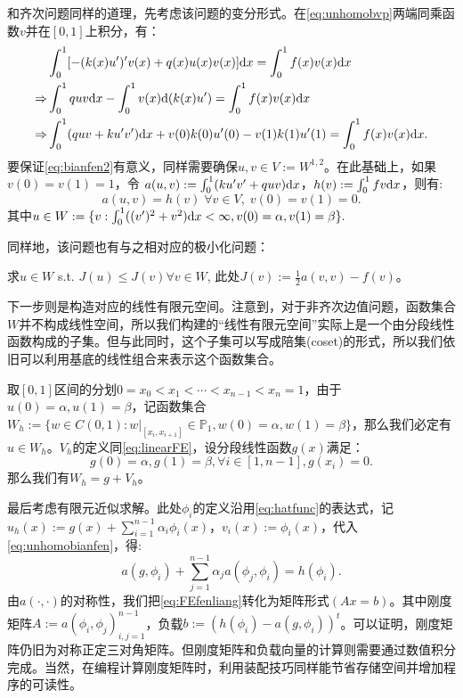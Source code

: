 和齐次问题同样的道理，先考虑该问题的变分形式。在\eqref{eq:unhomobvp}两端同乘函数$v$并在$[0,1]$上积分，有：
\begin{equation}
  \label{eq:bianfen2}
  \begin{aligned}
  &\int_{0}^{1}[-(k(x)u')'v(x)+q(x)u(x)v(x)]\mathrm{d} x=\int_{0}^{1}f(x)v(x)\mathrm{d} x\\
  \Rightarrow &\int_{0}^{1}quv\mathrm{d} x-\int_{0}^{1}v(x)\mathrm{d}(k(x)u')=\int_{0}^{1}f(x)v(x)\mathrm{d} x\\
  \Rightarrow &\int_{0}^{1}(quv+ku'v')\mathrm{d} x+v(0)k(0)u'(0)-v(1)k(1)u'(1)=\int_{0}^{1}f(x)v(x)\mathrm{d} x.\\
  \end{aligned}
\end{equation}
要保证\eqref{eq:bianfen2}有意义，同样需要确保$u,v\in V:=W^{1,2}$。在此基础上，如果$v(0)=v(1)=1$，令
$a(u,v):=\int_{0}^{1}(ku'v'+quv)\mathrm{d} x$，$h(v):=\int_{0}^{1}fv\mathrm{d} x$，则有:
\begin{equation}
  \label{eq:unhomobianfen}
  a(u,v)=h(v)\;\forall v\in V,\; v(0)=v(1)=0.
\end{equation}
其中$u\in W:=\{v:\int_{0}^{1}((v')^{2}+v^2)\mathrm{d} x<\infty, v(0)=\alpha, v(1)=\beta\}.$

同样地，该问题也有与之相对应的极小化问题：
\begin{example}
  \label{ex:optimal2}
  求$u\in W$ s.t. $J(u)\le J(v)\forall v\in W$, 此处$J(v):=\frac{1}{2}a(v,v)-f(v)$。
\end{example}

下一步则是构造对应的线性有限元空间。注意到，对于非齐次边值问题，函数集合$W$并不构成线性空间，所以我们构建的“线性有限元空间”实际上是一个由分段线性函数构成的子集。但与此同时，这个子集可以写成陪集(coset)的形式，所以我们依旧可以利用基底的线性组合来表示这个函数集合。

取$[0,1]$区间的分划$0=x_{0}<x_{1}<\cdots<x_{n-1}<x_{n}=1$，由于$u(0)=\alpha,u(1)=\beta$，记函数集合$W_{h}:=\{w\in C(0,1):w|_{[x_{i},x_{i+1}]}\in\mathbb{P}_{1},w(0)=\alpha,w(1)=\beta\}$，那么我们必定有$u\in W_{h}$。$V_{h}$的定义同\ref{eq:linearFE}，设分段线性函数$g(x)$满足：
\begin{equation}
  \label{eq:segmentlinearcondition}
  g(0)=\alpha,g(1)=\beta,\forall i\in[1,n-1],g(x_{i})=0.
\end{equation}
那么我们有$W_{h}=g+V_{h}$。

最后考虑有限元近似求解。此处$\phi_{i}$的定义沿用\eqref{eq:hatfunc}的表达式，记$u_{h}(x):=g(x)+\sum_{i=1}^{n-1}\alpha_{i}\phi_{i}(x)$，$v_{i}(x):=\phi_{i}(x)$，代入\eqref{eq:unhomobianfen}，得:
\begin{equation}
  \label{eq:FEfenliang}
  a(g,\phi_{i})+\sum_{j=1}^{n-1}\alpha_{j}a(\phi_{j},\phi_{i})=h(\phi_{i}).
\end{equation}
由$a(\cdot,\cdot)$的对称性，我们把\eqref{eq:FEfenliang}转化为矩阵形式$(Ax=b)$。其中刚度矩阵$A:=a(\phi_{i},\phi_{j})_{i,j=1}^{n-1}$，负载$b:=(h(\phi_{i})-a(g,\phi_{i}))^{t}$。可以证明，刚度矩阵仍旧为对称正定三对角矩阵。但刚度矩阵和负载向量的计算则需要通过数值积分完成。当然，在编程计算刚度矩阵时，利用装配技巧同样能节省存储空间并增加程序的可读性。

